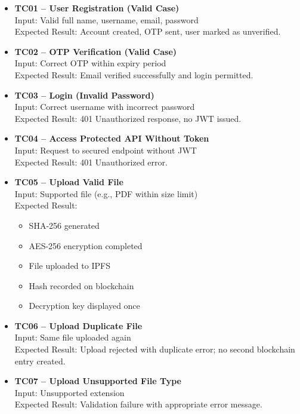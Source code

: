 \documentclass[12pt]{article}
\begin{document}
\begin{itemize}

\item \textbf{TC01 -- User Registration (Valid Case)} \\
Input: Valid full name, username, email, password \\
Expected Result: Account created, OTP sent, user marked as unverified.

\item \textbf{TC02 -- OTP Verification (Valid Case)} \\
Input: Correct OTP within expiry period \\
Expected Result: Email verified successfully and login permitted.

\item \textbf{TC03 -- Login (Invalid Password)} \\
Input: Correct username with incorrect password \\
Expected Result: 401 Unauthorized response, no JWT issued.

\item \textbf{TC04 -- Access Protected API Without Token} \\
Input: Request to secured endpoint without JWT \\
Expected Result: 401 Unauthorized error.

\item \textbf{TC05 -- Upload Valid File} \\
Input: Supported file (e.g., PDF within size limit) \\
Expected Result:
\begin{itemize}
\item SHA-256 generated
\item AES-256 encryption completed
\item File uploaded to IPFS
\item Hash recorded on blockchain
\item Decryption key displayed once
\end{itemize}

\item \textbf{TC06 -- Upload Duplicate File} \\
Input: Same file uploaded again \\
Expected Result: Upload rejected with duplicate error; no second blockchain entry created.

\item \textbf{TC07 -- Upload Unsupported File Type} \\
Input: Unsupported extension \\
Expected Result: Validation failure with appropriate error message.


\end{itemize}
\end{document}
